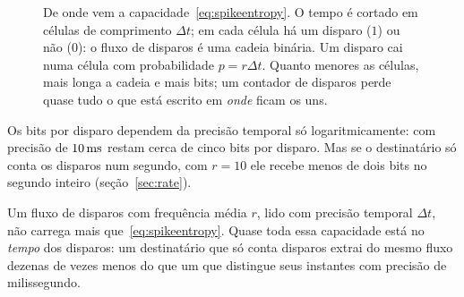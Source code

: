 \begin{figure}[t]
\centering
{}
\caption{De onde vem a capacidade~\eqref{eq:spikeentropy}. O tempo é cortado em células de comprimento $\Delta t$; em cada célula há um disparo ($1$) ou não ($0$): o fluxo de disparos é uma cadeia binária. Um disparo cai numa célula com probabilidade $p=r\Delta t$. Quanto menores as células, mais longa a cadeia e mais bits; um contador de disparos perde quase tudo o que está escrito em \emph{onde} ficam os uns.}
\label{fig:cells}
\end{figure}

Os bits por disparo dependem da precisão temporal só logaritmicamente: com precisão de $10\,\text{ms}$ restam cerca de cinco bits por disparo. Mas se o destinatário só conta os disparos num segundo, com $r=10$ ele recebe menos de dois bits no segundo inteiro (seção~\ref{sec:rate}).

\begin{keyblock}
\begin{proposition}
\label{prop:capacity}
Um fluxo de disparos com frequência média $r$, lido com precisão temporal $\Delta t$, não carrega mais que~\eqref{eq:spikeentropy}. Quase toda essa capacidade está no \emph{tempo} dos disparos: um destinatário que só conta disparos extrai do mesmo fluxo dezenas de vezes menos do que um que distingue seus instantes com precisão de milissegundo.
\end{proposition}
\end{keyblock}

